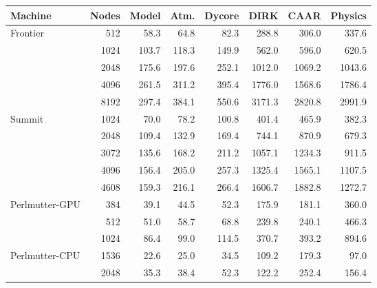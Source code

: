 \begin{tabular}{lr|rrrrrr}
Machine & Nodes & Model & Atm. & Dycore & DIRK & CAAR & Physics \\
\hline
Frontier & 512 & 58.3 & 64.8 & 82.3 & 288.8 & 306.0 & 337.6 \\
 & 1024 & 103.7 & 118.3 & 149.9 & 562.0 & 596.0 & 620.5 \\
 & 2048 & 175.6 & 197.6 & 252.1 & 1012.0 & 1069.2 & 1043.6 \\
 & 4096 & 261.5 & 311.2 & 395.4 & 1776.0 & 1568.6 & 1786.4 \\
 & 8192 & 297.4 & 384.1 & 550.6 & 3171.3 & 2820.8 & 2991.9 \\
\hline
Summit & 1024 & 70.0 & 78.2 & 100.8 & 401.4 & 465.9 & 382.3 \\
 & 2048 & 109.4 & 132.9 & 169.4 & 744.1 & 870.9 & 679.3 \\
 & 3072 & 135.6 & 168.2 & 211.2 & 1057.1 & 1234.3 & 911.5 \\
 & 4096 & 156.4 & 205.0 & 257.3 & 1325.4 & 1565.1 & 1107.5 \\
 & 4608 & 159.3 & 216.1 & 266.4 & 1606.7 & 1882.8 & 1272.7 \\
\hline
Perlmutter-GPU & 384 & 39.1 & 44.5 & 52.3 & 175.9 & 181.1 & 360.0 \\
 & 512 & 51.0 & 58.7 & 68.8 & 239.8 & 240.1 & 466.3 \\
 & 1024 & 86.4 & 99.0 & 114.5 & 370.7 & 393.2 & 894.6 \\
\hline
Perlmutter-CPU & 1536 & 22.6 & 25.0 & 34.5 & 109.2 & 179.3 & 97.0 \\
 & 2048 & 35.3 & 38.4 & 52.3 & 122.2 & 252.4 & 156.4 \\
\end{tabular}
